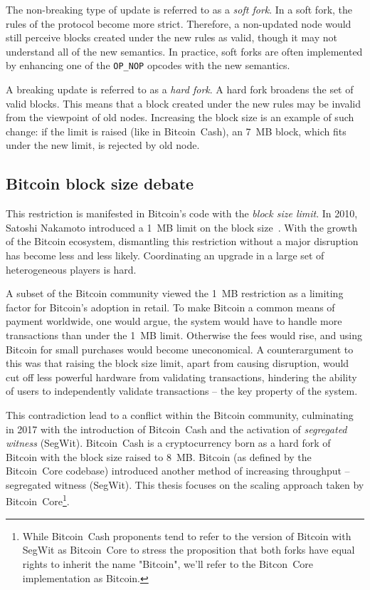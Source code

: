 The non-breaking type of update is referred to as a \textit{soft fork}.
In a soft fork, the rules of the protocol become more strict.
Therefore, a non-updated node would still perceive blocks created under the new rules as valid, though it may not understand all of the new semantics.
In practice, soft forks are often implemented by enhancing one of the \texttt{OP_NOP} opcodes with the new semantics.

A breaking update is referred to as a \textit{hard fork}.
A hard fork broadens the set of valid blocks.
This means that a block created under the new rules may be invalid from the viewpoint of old nodes.
Increasing the block size is an example of such change: if the limit is raised (like in Bitcoin~Cash), an 7~MB block, which fits under the new limit, is rejected by old node.

\subsection{Bitcoin block size debate}

This restriction is manifested in Bitcoin's code with the \textit{block size limit}.
In 2010, Satoshi Nakamoto introduced a 1~MB limit on the block size~\cite{Nakamoto2010}.
With the growth of the Bitcoin ecosystem, dismantling this restriction without a major disruption has become less and less likely.
Coordinating an upgrade in a large set of heterogeneous players is hard.

A subset of the Bitcoin community viewed the 1~MB restriction as a limiting factor for Bitcoin's adoption in retail.
To make Bitcoin a common means of payment worldwide, one would argue, the system would have to handle more transactions than under the 1~MB limit.
Otherwise the fees would rise, and using Bitcoin for small purchases would become uneconomical.
A counterargument to this was that raising the block size limit, apart from causing disruption, would cut off less powerful hardware from validating transactions, hindering the ability of users to independently validate transactions -- the key property of the system.

This contradiction lead to a conflict within the Bitcoin community, culminating in 2017 with the introduction of Bitcoin~Cash and the activation of \textit{segregated witness} (SegWit).
Bitcoin~Cash is a cryptocurrency born as a hard fork of Bitcoin with the block size raised to 8~MB.
Bitcoin (as defined by the Bitcoin~Core codebase) introduced another method of increasing throughput -- segregated witness (SegWit).
This thesis focuses on the scaling approach taken by Bitcoin~Core\footnote{While Bitcoin~Cash proponents tend to refer to the version of Bitcoin with SegWit as Bitcoin~Core to stress the proposition that both forks have equal rights to inherit the name "Bitcoin", we'll refer to the Bitcon~Core implementation as Bitcoin.}.

